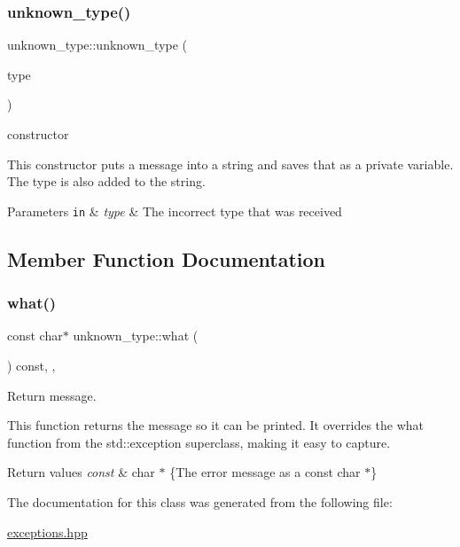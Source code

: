 \subsubsection{\texorpdfstring{unknown\+\_\+type()}{unknown\_type()}}
{\footnotesize\ttfamily unknown\+\_\+type\+::unknown\+\_\+type (\begin{DoxyParamCaption}\item[{const std\+::string}]{type }\end{DoxyParamCaption})\hspace{0.3cm}{\ttfamily [inline]}}



constructor 

This constructor puts a message into a string and saves that as a private variable. The type is also added to the string.


\begin{DoxyParams}[1]{Parameters}
\mbox{\tt in}  & {\em type} & The incorrect type that was received \\
\hline
\end{DoxyParams}


\subsection{Member Function Documentation}
\mbox{\label{classunknown__type_a95f8c551c7bf001353d4a68b6874650d}} 
\subsubsection{\texorpdfstring{what()}{what()}}
{\footnotesize\ttfamily const char$\ast$ unknown\+\_\+type\+::what (\begin{DoxyParamCaption}{ }\end{DoxyParamCaption}) const\hspace{0.3cm}{\ttfamily [inline]}, {\ttfamily [override]}, {\ttfamily [noexcept]}}



Return message. 

This function returns the message so it can be printed. It overrides the what function from the std\+::exception superclass, making it easy to capture.


\begin{DoxyRetVals}{Return values}
{\em const} & char $\ast$ \{The error message as a const char $\ast$\} \\
\hline
\end{DoxyRetVals}


The documentation for this class was generated from the following file\+:\begin{DoxyCompactItemize}
\item 
\hyperlink{exceptions_8hpp}{exceptions.\+hpp}\end{DoxyCompactItemize}
